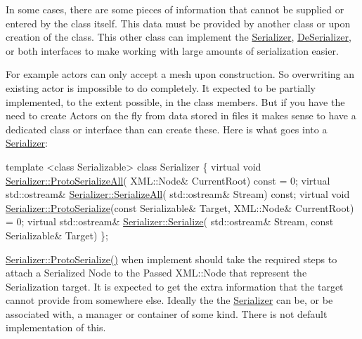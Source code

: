 In some cases, there are some pieces of information that cannot be supplied or entered by the class itself. This data must be provided by another class or upon creation of the class. This other class can implement the \hyperlink{classMezzanine_1_1Serializer}{Serializer}, \hyperlink{classMezzanine_1_1DeSerializer}{De\-Serializer}, or both interfaces to make working with large amounts of serialization easier. \par
 \par
 For example actors can only accept a mesh upon construction. So overwriting an existing actor is impossible to do completely. It expected to be partially implemented, to the extent possible, in the class members. But if you have the need to create Actors on the fly from data stored in files it makes sense to have a dedicated class or interface than can create these. Here is what goes into a \hyperlink{classMezzanine_1_1Serializer}{Serializer}\-: 
\begin{DoxyCode}
\textcolor{keyword}{template} <\textcolor{keyword}{class} Serializable> \textcolor{keyword}{class }Serializer
\{
    \textcolor{keyword}{virtual} \textcolor{keywordtype}{void} \hyperlink{classMezzanine_1_1Serializer_addec7bf46f6d1b149eaf3e449c5d8501}{Serializer::ProtoSerializeAll}(
      XML::Node& CurrentRoot) \textcolor{keyword}{const} = 0;
    \textcolor{keyword}{virtual} std::ostream& \hyperlink{classMezzanine_1_1Serializer_aa178dfa519a2e73e84c0a2f35b2b8b5f}{Serializer::SerializeAll}(
      std::ostream& Stream) \textcolor{keyword}{const};
    \textcolor{keyword}{virtual} \textcolor{keywordtype}{void} \hyperlink{classMezzanine_1_1Serializer_ae20b1167a26fe0d913c9123788d30657}{Serializer::ProtoSerialize}(\textcolor{keyword}{const} 
      Serializable& Target, XML::Node& CurrentRoot) = 0;
    \textcolor{keyword}{virtual} std::ostream& \hyperlink{classMezzanine_1_1Serializer_af71f7716c36ba0a583ab1e29e08cac6d}{Serializer::Serialize}(
      std::ostream& Stream, \textcolor{keyword}{const} Serializable& Target)
\};
\end{DoxyCode}
 \hyperlink{classMezzanine_1_1Serializer_ae20b1167a26fe0d913c9123788d30657}{Serializer\-::\-Proto\-Serialize()} when implement should take the required steps to attach a Serialized Node to the Passed X\-M\-L\-::\-Node that represent the Serialization target. It is expected to get the extra information that the target cannot provide from somewhere else. Ideally the the \hyperlink{classMezzanine_1_1Serializer}{Serializer} can be, or be associated with, a manager or container of some kind. There is not default implementation of this. \par
